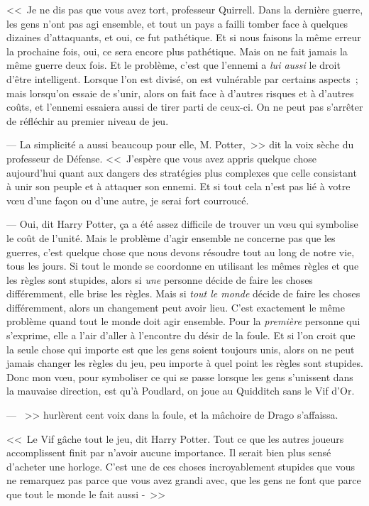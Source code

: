 <<~Je ne dis pas que vous avez tort, professeur Quirrell. Dans la dernière guerre, les gens n'ont pas agi ensemble, et tout un pays a failli tomber face à quelques dizaines d'attaquants, et oui, ce fut pathétique. Et si nous faisons la même erreur la prochaine fois, oui, ce sera encore plus pathétique. Mais on ne fait jamais la même guerre deux fois. Et le problème, c'est que l'ennemi a \emph{lui aussi} le droit d'être intelligent. Lorsque l'on est divisé, on est vulnérable par certains aspects~; mais lorsqu'on essaie de s'unir, alors on fait face à d'autres risques et à d'autres coûts, et l'ennemi essaiera aussi de tirer parti de ceux-ci. On ne peut pas s'arrêter de réfléchir au premier niveau de jeu.

--- La simplicité a aussi beaucoup pour elle, M. Potter,~>> dit la voix sèche du professeur de Défense. <<~J'espère que vous avez appris quelque chose aujourd'hui quant aux dangers des stratégies plus complexes que celle consistant à unir son peuple et à attaquer son ennemi. Et si tout cela n'est pas lié à votre vœu d'une façon ou d'une autre, je serai fort courroucé.

--- Oui, dit Harry Potter, ça a été assez difficile de trouver un vœu qui symbolise le coût de l'unité. Mais le problème d'agir ensemble ne concerne pas que les guerres, c'est quelque chose que nous devons résoudre tout au long de notre vie, tous les jours. Si tout le monde se coordonne en utilisant les mêmes règles et que les règles sont stupides, alors si \emph{une} personne décide de faire les choses différemment, elle brise les règles. Mais si \emph{tout le monde} décide de faire les choses différemment, alors un changement peut avoir lieu. C'est exactement le même problème quand tout le monde doit agir ensemble. Pour la \emph{première} personne qui s'exprime, elle a l'air d'aller à l'encontre du désir de la foule. Et si l'on croit que la seule chose qui importe est que les gens soient toujours unis, alors on ne peut jamais changer les règles du jeu, peu importe à quel point les règles sont stupides. Donc mon vœu, pour symboliser ce qui se passe lorsque les gens s'unissent dans la mauvaise direction, est qu'à Poudlard, on joue au Quidditch sans le Vif d'Or.

--- ~>> hurlèrent cent voix dans la foule, et la mâchoire de Drago s'affaissa.

<<~Le Vif gâche tout le jeu, dit Harry Potter. Tout ce que les autres joueurs accomplissent finit par n'avoir aucune importance. Il serait bien plus sensé d'acheter une horloge. C'est une de ces choses incroyablement stupides que vous ne remarquez pas parce que vous avez grandi avec, que les gens ne font que parce que tout le monde le fait aussi -~>>

